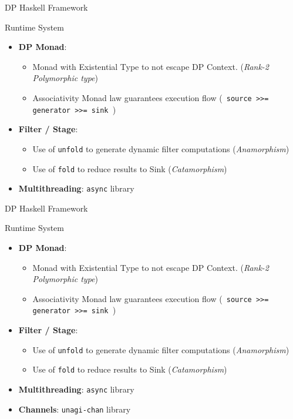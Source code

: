 \documentclass{beamer}
\begin{document}
  \begin{frame}[fragile]{DP Haskell Framework}
    \begin{block}{Runtime System}
      \begin{itemize}
        \item \textbf{DP Monad}:
        \begin{itemize} 
        \item Monad with Existential Type to not escape DP Context. (\textit{Rank-2 Polymorphic type})
        \item Associativity Monad law guarantees execution flow (\texttt{ source >>= generator >>= sink }) 
        \end{itemize}
        \item \textbf{Filter / Stage}: 
        \begin{itemize}
          \item Use of \texttt{unfold} to generate dynamic filter computations (\textit{Anamorphism})
          \item Use of \texttt{fold} to reduce results to Sink (\textit{Catamorphism})
        \end{itemize}
        \item \textbf{Multithreading}: \texttt{async} library
      \end{itemize}
    \end{block}
    \end{frame}
  
  \begin{frame}[fragile]{DP Haskell Framework}
  \begin{block}{Runtime System}
    \begin{itemize}
      \item \textbf{DP Monad}:
      \begin{itemize} 
      \item Monad with Existential Type to not escape DP Context. (\textit{Rank-2 Polymorphic type})
      \item Associativity Monad law guarantees execution flow (\texttt{ source >>= generator >>= sink }) 
      \end{itemize}
    \item \textbf{Filter / Stage}: 
      \begin{itemize}
        \item Use of \texttt{unfold} to generate dynamic filter computations (\textit{Anamorphism})
        \item Use of \texttt{fold} to reduce results to Sink (\textit{Catamorphism})
      \end{itemize}
      \item \textbf{Multithreading}: \texttt{async} library
      \item \textbf{Channels}: \texttt{unagi-chan} library
    \end{itemize}
  \end{block}
  \end{frame}
\end{document}
